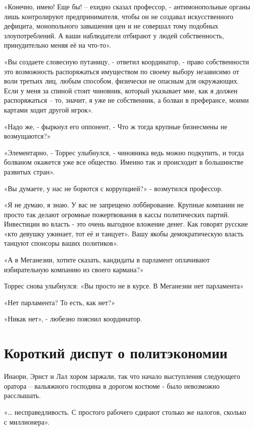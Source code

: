\documentclass[10pt,final]{book}
\begin{document}
«Конечно, имею! Еще бы! -- ехидно сказал профессор, - антимонопольные органы лишь контролируют предпринимателя, чтобы он не создавал искусственного дефицита, монопольного завышения цен и не совершал тому подобных злоупотреблений. А ваши наблюдатели отбирают у людей собственность, принудительно меняя её на что-то».

«Вы создаете словесную путаницу, - ответил координатор, - право собственности это возможность распоряжаться имуществом по своему выбору независимо от воли третьих лиц, любым способом, физически не опасным для окружающих. Если у меня за спиной стоит чиновник, который указывает мне, как я должен распоряжаться -- то, значит, я уже не собственник, а болван в преферансе, моими картами ходит другой игрок».

«Надо же, - фыркнул его оппонент, - Что ж тогда крупные бизнесмены не возмущаются?»

«Элементарно, - Торрес улыбнулся, - чиновника ведь можно подкупить, и тогда болваном окажется уже все общество. Именно так и происходит в большинстве развитых стран».

«Вы думаете, у нас не борются с коррупцией?» - возмутился профессор.

«Я не думаю, я знаю. У вас не запрещено лоббирование. Крупные компании не просто так делают огромные пожертвования в кассы политических партий. Инвестиции во власть - это очень выгодное вложение денег. Как говорят русские «кто девушку ужинает, тот её и танцует». Вашу якобы демократическую власть танцуют спонсоры ваших политиков».

«А в Меганезии, хотите сказать, кандидаты в парламент оплачивают избирательную компанию из своего кармана?»

Торрес снова улыбнулся: «Вы просто не в курсе. В Меганезии нет парламента»

«Нет парламента? То есть, как нет?»

«Никак нет», - любезно пояснил координатор.



\chapter{Короткий диспут о политэкономии}


Инаори, Эрнст и Лал хором заржали, так что начало выступления следующего оратора -- вальяжного господина в дорогом костюме - было невозможно расслышать.

«\ldots{} несправедливость. С простого рабочего сдирают столько же налогов, сколько с миллионера».
\end{document}
